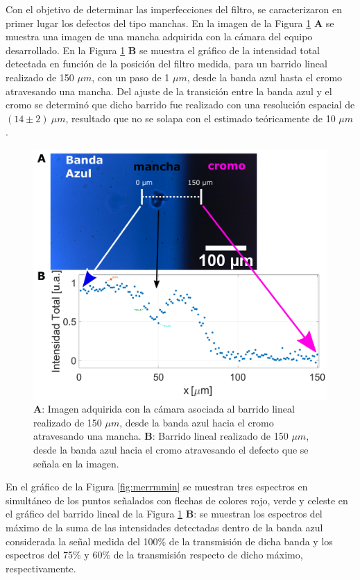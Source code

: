 Con el objetivo de determinar las imperfecciones del filtro, se caracterizaron en primer lugar los defectos del tipo manchas. En la imagen de la Figura \ref{fig:barinted} \textbf{A} se muestra una imagen de una mancha adquirida con la cámara del equipo desarrollado. En la Figura \ref{fig:barinted} \textbf{B} se muestra el gráfico de la intensidad total detectada en función de la posición del filtro medida, para un barrido lineal realizado de 150 $\mu m$, con un paso de 1 $\mu m$, desde la banda azul hasta el cromo atravesando una mancha. Del ajuste de la transición entre la banda azul y el cromo se determinó que dicho barrido fue realizado con una resolución espacial de $(14 \pm 2)~\mu m$, resultado que no se solapa con el estimado teóricamente de 10 $\mu m$.
 \begin{figure}
	\centering
	\includegraphics[width=1.0\textwidth]{Figs/microespectrometro/manchacondetalles.png}
	\caption{\textbf{A}: Imagen adquirida con la cámara asociada al barrido lineal realizado de 150 $\mu m$, desde la banda azul hacia el cromo atravesando una mancha. \textbf{B}: Barrido lineal realizado de 150 $\mu m$, desde la banda azul hacia el cromo atravesando el defecto que se señala en la imagen.}
	\label{fig:barinted}
\end{figure}


En el gráfico de la Figura \ref{fig:merrmmin} se muestran tres espectros en simultáneo de los puntos señalados con flechas de colores rojo, verde y celeste en el gráfico del barrido lineal de la Figura \ref{fig:barinted} \textbf{B}: se muestran los espectros del máximo de la suma de las intensidades detectadas dentro de la banda azul considerada la señal medida del 100\% de la transmisión de dicha banda y los espectros del 75\% y 60\% de la transmisión respecto de dicho máximo, respectivamente. 

